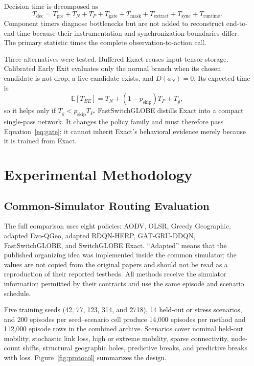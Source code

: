 \documentclass[drones,article,submit,moreauthors]{Definitions/mdpi}
\newcommand{\SG}{SwitchGLOBE}
\newcommand{\FastSG}{FastSwitchGLOBE}
\newcommand{\E}{\mathbb{E}}
\newcommand{\VerifyEdit}[1]{\textcolor{ReviewBlue}{#1}}
\begin{document}
Decision time is decomposed as
\begin{equation}
T_{\mathrm{dec}}=T_{\mathrm{pre}}+T_N+T_P+T_{\mathrm{gate}}+T_{\mathrm{mask}}+T_{\mathrm{extract}}+T_{\mathrm{sync}}+T_{\mathrm{runtime}}.
\end{equation}
Component timers diagnose bottlenecks but are not added to reconstruct end-to-end time because their instrumentation and synchronization boundaries differ. The primary statistic times the complete observation-to-action call.

Three alternatives were tested. Buffered Exact reuses input-tensor storage. Calibrated Early Exit evaluates only the normal branch when its chosen candidate is not drop, a live candidate exists, and $D(a_N)=0$. Its expected time is
\begin{equation}
\E[T_{EE}]=T_N+(1-p_{\mathrm{skip}})T_P+T_g,
\end{equation}
so it helps only if $T_g<p_{\mathrm{skip}}T_P$. \FastSG{} distills Exact into a compact single-pass network. It changes the policy family and must therefore pass Equation~\eqref{eq:gate}; it cannot inherit Exact's behavioral evidence merely because it is trained from Exact.

\section{Experimental Methodology}

\subsection{Common-Simulator Routing Evaluation}

The full comparison uses eight policies: AODV, OLSR, Greedy Geographic, adapted Evo-QGeo, adapted RDQN-HERP, GAT-GRU-DDQN, \FastSG{}, and \SG{} Exact. ``Adapted'' means that the published organizing idea was implemented inside the common simulator; the values are not copied from the original papers and should not be read as a reproduction of their reported testbeds. All methods receive the simulator information permitted by their contracts and use the same episode and scenario schedule.

\VerifyEdit{Five training seeds (42, 77, 123, 314, and 2718), 14 held-out or stress scenarios, and 200 episodes per seed--scenario cell produce 14,000 episodes per method and 112,000 episode rows in the combined archive.} Scenarios cover nominal held-out mobility, stochastic link loss, high or extreme mobility, sparse connectivity, node-count shifts, structural geographic holes, predictive breaks, and predictive breaks with loss. Figure~\ref{fig:protocol} summarizes the design.
\end{document}
